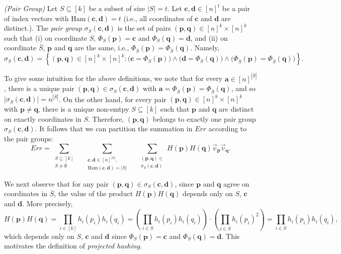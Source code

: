 \def\draft{0}  \documentclass[proceedings]{stacs}
\theoremstyle{plain}\newtheorem{satz}[thm]{Satz}
\theoremstyle{definition}\newtheorem{crucial}[thm]{Crucial Definition}
\newcommand{\vecv}{{\vec{v}} }
\newcommand{\barS}{{\bar{S}} }
\newcommand{\bfp}{{\mathbf p} }
\newcommand{\bfq}{{\mathbf q} }
\newcommand{\bfa}{{\mathbf a} }
\newcommand{\bfc}{{\mathbf c} }
\newcommand{\bfd}{{\mathbf d} }
\begin{document}
\begin{definition}\label{def:pairs projection} \emph{(Pair Group)}
Let $S \subseteq [k]$ be a subset of size $|S| = t$. Let $\bfc, \bfd\in [n]^t$ be a pair of index vectors with $\mathrm{Ham}(\bfc, \bfd) = t$ (i.e., all coordinates of $\bfc$ and $\bfd$ are distinct.). The \emph{pair group} $\sigma_S(\bfc, \bfd)$ is the set of pairs $(\bfp,\bfq) \in [n]^k \times [n]^k$ such that (i) on coordinate $S$, $\Phi_S(\bfp) = \bfc$ and $\Phi_S(\bfq) = \bfd$, and (ii) on coordinate $\barS$, $\bfp$ and $\bfq$ are the same, i.e., $\Phi_{\barS}(\bfp) = \Phi_{\barS}(\bfq)$. Namely,
\begin{equation}
\sigma_S(\bfc, \bfd) = \left\{(\bfp, \bfq) \in [n]^k \times [n]^k : \Big(\bfc = \Phi_S(\bfp)\Big) \wedge \Big(\bfd = \Phi_S(\bfq) \Big) \wedge \Big(\Phi_{\barS}(\bfp) = \Phi_{\barS}(\bfq)\Big)\right\}.
\end{equation}
\end{definition}

To give some intuition for the above definitions, we note that for every $\bfa \in [n]^{|\barS|}$, there is a unique pair $(\bfp,\bfq) \in \sigma_S(\bfc,\bfd)$ with $\bfa = \Phi_{\barS}(\bfp) = \Phi_{\barS}(\bfq)$, and so $|\sigma_S(\bfc,\bfd)| = n^{|\barS|}$. On the other hand, for every pair $(\bfp,\bfq) \in [n]^k \times [n]^k$ with $\bfp \neq \bfq$, there is a unique non-emtpy $S \subseteq [k]$ such that $\bfp$ and $\bfq$ are distinct on exactly coordinates in $S$. Therefore, $(\bfp,\bfq)$ belongs to exactly one pair group $\sigma_S(\bfc,\bfd)$. It follows that we can partition the summation in $Err$ according to the pair groups:
\begin{equation}\label{eq:errdecompose}
Err = \sum_{\substack{S \subseteq [k] \\S \neq \emptyset}}\ \ \ \ \  \sum_{\substack{\bfc,\bfd \in [n]^{|S|},\\ \mathrm{Ham}(\bfc, \bfd) = |S|}} \ \ \ \ \  \sum_{\substack{(\bfp,\bfq) \in \\ \sigma_S(\bfc,\bfd)}} H(\bfp)H(\bfq)\vecv_{\bfp}\vecv_{\bfq}.
\end{equation}

We next observe that for any pair $(\bfp,\bfq) \in \sigma_S(\bfc,\bfd)$, since $\bfp$ and $\bfq$ agree on coordinates in $\barS$, the value of the product $H(\bfp)H(\bfq)$ depends only on $S$, $\bfc$ and  $\bfd$. More precisely,
$$H(\bfp)H(\bfq) = \prod_{i\in[k]} h_i(p_i) h_i(q_i) = \left( \prod_{i\in S} h_i(p_i) h_i(q_i) \right) \cdot \left( \prod_{i\in \barS} h_i(p_i)^2 \right) = \prod_{i\in S} h_i(p_i) h_i(q_i),$$
which depends only on $S$, $\bfc$ and  $\bfd$ since  $\Phi_S(\bfp) = \bfc$ and $\Phi_S(\bfq) = \bfd$. This motivates the definition of \emph{projected hashing}.
\end{document}
